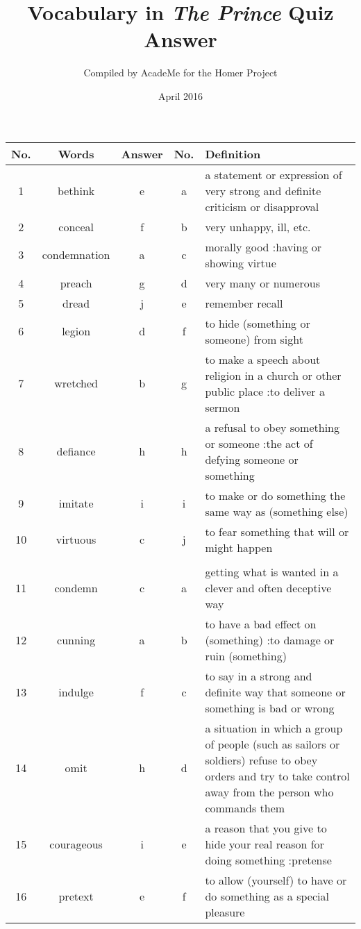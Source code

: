 \documentclass[a4paper]{article}
\title{Vocabulary in \textit{The Prince} Quiz Answer}
\author{Compiled by AcadeMe for the Homer Project}
\date{April 2016}
\begin{document}
\maketitle
\begin{center}
\begin{tabular}{|c|c|c|c|m{}|}
\hline
No. & Words & Answer & No. & Definition \\
\hline
 1  & bethink & e & a &  a statement or expression of very strong and definite criticism or disapproval \\
\hline
 2  & conceal & f & b &  very unhappy, ill, etc. \\
\hline
 3  & condemnation & a & c &  morally good :having or showing virtue \\
\hline
 4  & preach & g & d &  very many or numerous \\
\hline
 5  & dread & j & e &  remember recall\\
\hline
 6  & legion & d & f &  to hide (something or someone) from sight \\
\hline
 7  & wretched & b & g &  to make a speech about religion in a church or other public place :to deliver a sermon \\
\hline
 8  & defiance & h & h &  a refusal to obey something or someone :the act of defying someone or something \\
\hline
 9  & imitate & i & i &  to make or do something the same way as (something else) \\
\hline
 10  & virtuous & c & j &  to fear something that will or might happen \\
\hline
 & & & & \\
\hline
 11  & condemn & c & a &  getting what is wanted in a clever and often deceptive way \\
\hline
 12  & cunning & a & b &  to have a bad effect on (something) :to damage or ruin (something) \\
\hline
 13  & indulge & f & c &  to say in a strong and definite way that someone or something is bad or wrong \\
\hline
 14  & omit & h & d &  a situation in which a group of people (such as sailors or soldiers) refuse to obey orders and try to take control away from the person who commands them \\
\hline
 15  & courageous & i & e &  a reason that you give to hide your real reason for doing something :pretense \\
\hline
 16  & pretext & e & f &  to allow (yourself) to have or do something as a special pleasure \\

\end{tabular}
\end{center}
\end{document}

